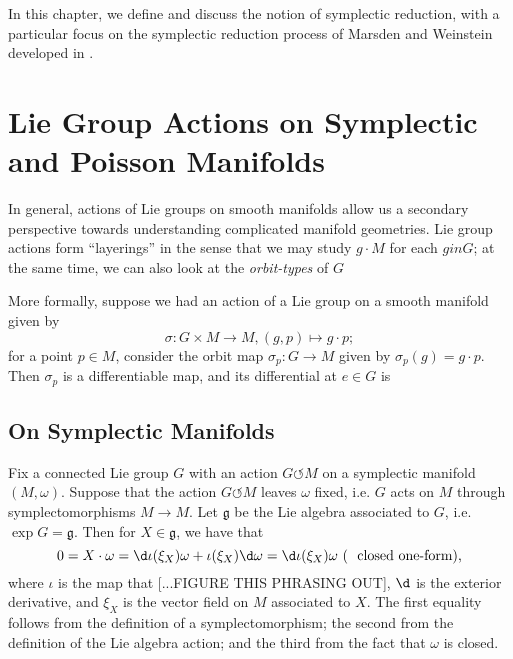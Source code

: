 In this chapter, we define and discuss the notion of symplectic reduction, with a particular focus on the symplectic reduction process of Marsden and Weinstein developed in \cite{marsdenweinstein}.















\section{Lie Group Actions on Symplectic and Poisson Manifolds}
In general, actions of Lie groups on smooth manifolds allow us a secondary perspective towards understanding complicated manifold geometries. Lie group actions form ``layerings'' in the sense that we may study $g \cdot M$ for each $g in G$; at the same time, we can also look at the \emph{orbit-types} of $G$ %

More formally, suppose we had an action of a Lie group on a smooth manifold given by
$$
\sigma: G \times M \to M, (g,p) \mapsto g \cdot p;
$$
for a point $p \in M$, consider the orbit map $\sigma_p: G \to M$ given by $\sigma_p(g) = g \cdot p$. Then $\sigma_p$ is a differentiable map, and its differential at $e \in G$ is %

\subsection{On Symplectic Manifolds}
Fix a connected Lie group $G$ with an action $G \circlearrowleft M$ on a symplectic manifold $(M,\omega)$. Suppose that the action $G \circlearrowleft M$ leaves $\omega$ fixed, i.e. $G$ acts on $M$ through symplectomorphisms $M \to M$. Let $\mathfrak{g}$ be the Lie algebra associated to $G$, i.e. $\exp G = \mathfrak{g}$. Then for $X \in \mathfrak{g}$, we have that
$$
0 = X \cdot \omega = \d \iota(\xi_X)\omega + \iota(\xi_X)\d \omega = \d \iota(\xi_X)\omega \mbox{ (~ closed one-form),}
$$
where $\iota$ is the map that [...FIGURE THIS PHRASING OUT], $\d$ is the exterior derivative, and $\xi_X$ is the vector field on $M$ associated to $X$. The first equality follows from the definition of a symplectomorphism; the second from the definition of the Lie algebra action; and the third from the fact that $\omega$ is closed. %

